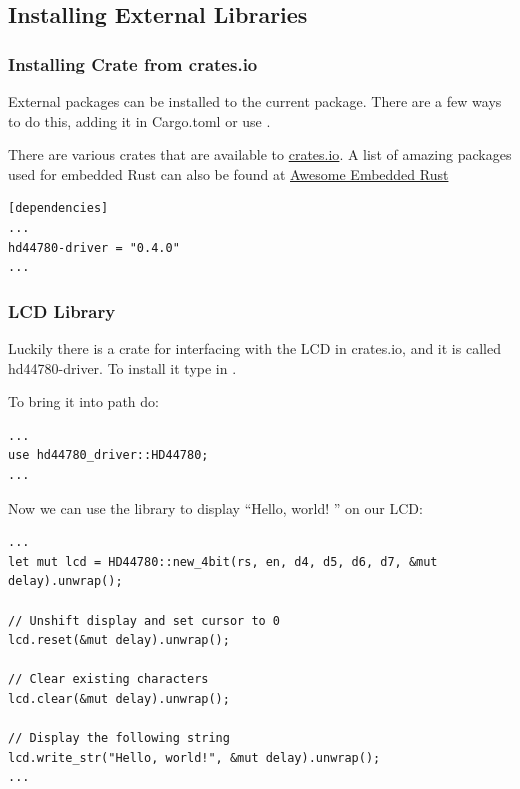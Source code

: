 \documentclass{beamer}
\begin{document}
\subsection{Installing External Libraries}
\begin{frame}[fragile]
  \frametitle{Installing Crate from crates.io}
  External packages can be installed to the current package. There are a few ways to do this, adding it in Cargo.toml or use .

  There are various crates that are available to \href{crates.io}{crates.io}. A list of amazing packages used for embedded Rust can also be found at \href{https://github.com/rust-embedded/awesome-embedded-rust}{Awesome Embedded Rust}

\begin{lstlisting}[caption={Adding Dependencies in Cargo.toml}]
[dependencies]
...
hd44780-driver = "0.4.0"
...
\end{lstlisting}
\end{frame}

\begin{frame}
  \frametitle{LCD Library}
  Luckily there is a crate for interfacing with the LCD in crates.io, and it is called hd44780-driver. To install it type in .

  To bring it into path do:
\begin{lstlisting}[]
...
use hd44780_driver::HD44780;
...
\end{lstlisting}

  \pagebreak

  Now we can use the library to display ``Hello, world! '' on our LCD:\@

\begin{lstlisting}[]
...
let mut lcd = HD44780::new_4bit(rs, en, d4, d5, d6, d7, &mut delay).unwrap();

// Unshift display and set cursor to 0
lcd.reset(&mut delay).unwrap();

// Clear existing characters
lcd.clear(&mut delay).unwrap();

// Display the following string
lcd.write_str("Hello, world!", &mut delay).unwrap();
...
\end{lstlisting}
\end{frame}
\end{document}
